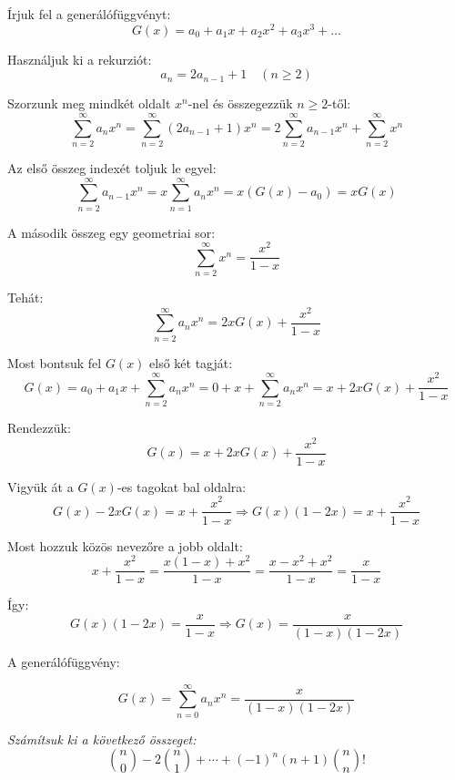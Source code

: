 \begin{solution}
Írjuk fel a generálófüggvényt: 
\[
G(x)=a_{0}+a_{1}x+a_{2}x^{2}+a_{3}x^{3}+\dots
\]

Használjuk ki a rekurziót: 
\[
a_{n}=2a_{n-1}+1\quad(n\geq2)
\]

Szorzunk meg mindkét oldalt $x^{n}$-nel és összegezzük $n\geq2$-től:
\[
\sum_{n=2}^{\infty}a_{n}x^{n}=\sum_{n=2}^{\infty}(2a_{n-1}+1)x^{n}=2\sum_{n=2}^{\infty}a_{n-1}x^{n}+\sum_{n=2}^{\infty}x^{n}
\]

Az első összeg indexét toljuk le egyel: 
\[
\sum_{n=2}^{\infty}a_{n-1}x^{n}=x\sum_{n=1}^{\infty}a_{n}x^{n}=x(G(x)-a_{0})=xG(x)
\]

A második összeg egy geometriai sor: 
\[
\sum_{n=2}^{\infty}x^{n}=\frac{x^{2}}{1-x}
\]

Tehát: 
\[
\sum_{n=2}^{\infty}a_{n}x^{n}=2xG(x)+\frac{x^{2}}{1-x}
\]

Most bontsuk fel $G(x)$ első két tagját: 
\[
G(x)=a_{0}+a_{1}x+\sum_{n=2}^{\infty}a_{n}x^{n}=0+x+\sum_{n=2}^{\infty}a_{n}x^{n}=x+2xG(x)+\frac{x^{2}}{1-x}
\]

Rendezzük: 
\[
G(x)=x+2xG(x)+\frac{x^{2}}{1-x}
\]

Vigyük át a $G(x)$-es tagokat bal oldalra: 
\[
G(x)-2xG(x)=x+\frac{x^{2}}{1-x}\Rightarrow G(x)(1-2x)=x+\frac{x^{2}}{1-x}
\]

Most hozzuk közös nevezőre a jobb oldalt: 
\[
x+\frac{x^{2}}{1-x}=\frac{x(1-x)+x^{2}}{1-x}=\frac{x-x^{2}+x^{2}}{1-x}=\frac{x}{1-x}
\]

Így: 
\[
G(x)(1-2x)=\frac{x}{1-x}\Rightarrow G(x)=\frac{x}{(1-x)(1-2x)}
\]

A generálófüggvény:

\[
\boxed{G(x)=\sum_{n=0}^{\infty}a_{n}x^{n}=\frac{x}{(1-x)(1-2x)}}
\]
\end{solution}
\begin{extraproblem}
\textit{\emph{Számítsuk ki a következő összeget:}}\emph{ }
\[
\binom{n}{0}-2\binom{n}{1}+\cdots+(-1)^{n}(n+1)\binom{n}{n}!
\]
\end{extraproblem}

